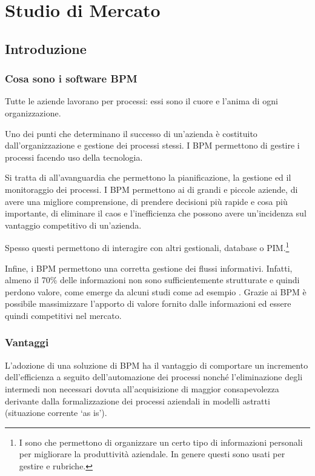 \chapter{Studio di Mercato}\label{sec:studiodimercato}
\section{Introduzione}
\subsection{Cosa sono i software BPM}
	
Tutte le aziende lavorano per processi: essi sono il cuore e l'anima di ogni organizzazione.
		
Uno dei punti che determinano il successo di un'azienda è costituito dall'organizzazione e gestione dei processi stessi. I \sw BPM permettono di gestire i processi facendo uso della tecnologia. 
		
Si tratta di \sw all'avanguardia che permettono la pianificazione, la gestione ed il monitoraggio dei processi.
I \sw BPM permettono  ai  di grandi e piccole aziende, di avere una migliore comprensione, di prendere decisioni più rapide e cosa più importante, di eliminare il caos e l'inefficienza che possono avere un'incidenza sul vantaggio competitivo di un'azienda.

Spesso questi \sw permettono di interagire con altri \sw gestionali, database o PIM\@.\footnote{I  sono \sw che permettono di organizzare un certo tipo di informazioni personali per migliorare la produttività aziendale. In genere questi \sw sono usati per gestire  e rubriche.}

Infine, i \sw BPM permettono una corretta gestione dei flussi informativi. Infatti, almeno il 70\% delle informazioni non sono sufficientemente strutturate e quindi perdono valore, come emerge da alcuni studi come ad esempio \cite{mazzolari:bpmita}. Grazie ai \sw BPM è possibile massimizzare l'apporto di valore fornito dalle informazioni ed essere quindi competitivi nel mercato.

\subsection{Vantaggi}
L'adozione di una soluzione di BPM ha il vantaggio di comportare un incremento dell'efficienza a seguito dell'automazione dei processi nonché l'eliminazione degli  intermedi non necessari dovuta all'acquisizione di maggior consapevolezza derivante dalla formalizzazione dei processi aziendali in modelli astratti (situazione corrente `as is').

